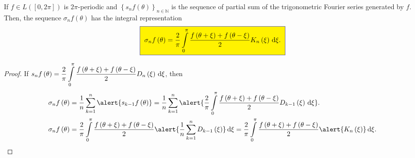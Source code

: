 \begin{frame}
	\frametitle{\secname}

	\begin{lemma}
		If $f\in L\left(\left[0,2\pi\right]\right)$ is $2\pi$-periodic
		and $\left\{s_{n}f\left(\theta\right)\right\}_{n\in\mathds{N}}$
		is the sequence of partial sum of the trigonometric Fourier
		series generated by $f$.
		Then, the sequence
		\begin{math}
			\sigma_{n}
			f\left(\theta\right)
		\end{math}
		has the integral representation
		\begin{equation*}
			\fcolorbox{DarkBlue}{yellow}{
				\begin{math}
					\displaystyle
					\sigma_{n}f\left(\theta\right)=
					\frac{2}{\pi}
					\int\limits_{0}^{\pi}
					\frac{f\left(\theta+\xi\right)+f\left(\theta-\xi\right)}{2}
					K_{n}\left(\xi\right)\dl\xi.
				\end{math}
			}
		\end{equation*}
	\end{lemma}

	\begin{proof}
		If
		\begin{math}
			s_{n}f\left(\theta\right)=
			\displaystyle
			\frac{2}{\pi}
			\int\limits_{0}^{\pi}
			\frac{f\left(\theta+\xi\right)+f\left(\theta-\xi\right)}{2}
			D_{n}\left(\xi\right)\dl\xi
		\end{math},
		then
		\begin{align*}
			\sigma_{n}f\left(\theta\right)
			 & =
			\dfrac{1}{n}
			\sum\limits_{k=1}^{n}
			\alert{s_{k-1}f\left(\theta\right)}
			= \frac{1}{n}
			\sum\limits_{k=1}^{n}
			\alert{
				\frac{2}{\pi}
				\int\limits_{0}^{\pi}
				\frac{f\left(\theta+\xi\right)+f\left(\theta-\xi\right)}{2}
				D_{k-1}\left(\xi\right){\dl\xi}
			}.   \\
			\sigma_{n}f\left(\theta\right)
			 & =
			\frac{2}{\pi}
			\int\limits_{0}^{\pi}
			\frac{f\left(\theta+\xi\right)+f\left(\theta-\xi\right)}{2}
			\alert{
				\frac{1}{n}\sum\limits_{k=1}^{n}
				D_{k-1}\left(\xi\right)
			}
			\dl\xi
			=
			\frac{2}{\pi}
			\int\limits_{0}^{\pi}
			\frac{f\left(\theta+\xi\right)+f\left(\theta-\xi\right)}{2}
			\alert{K_{n}\left(\xi\right)}
			\dl\xi.
		\end{align*}
	\end{proof}
\end{frame}

